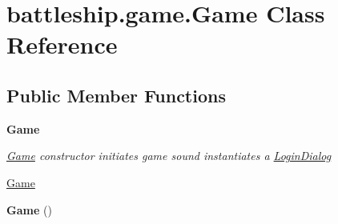 \hypertarget{classbattleship_1_1game_1_1Game}{}\section{battleship.\+game.\+Game Class Reference}
\label{classbattleship_1_1game_1_1Game}
\subsection*{Public Member Functions}
\begin{Indent}{\bf Game}\par
{\em \hyperlink{classbattleship_1_1game_1_1Game}{Game} constructor initiates game sound instantiates a \hyperlink{classbattleship_1_1game_1_1LoginDialog}{Login\+Dialog}

\hyperlink{classbattleship_1_1game_1_1Game}{Game} }\begin{DoxyCompactItemize}
\item 
\hypertarget{classbattleship_1_1game_1_1Game_aae771557e8f02337eb99c8aa99c79d00}{}{\bfseries Game} ()\label{classbattleship_1_1game_1_1Game_aae771557e8f02337eb99c8aa99c79d00}

\end{DoxyCompactItemize}
\end{Indent}
